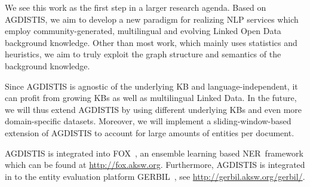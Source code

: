We see this work as the first step in a larger research agenda.
Based on AGDISTIS, we aim to develop a new paradigm for realizing \ac{NLP} services which employ community-generated, multilingual and evolving Linked Open Data background knowledge.
Other than most work, which mainly uses statistics and heuristics, we aim to truly exploit the graph structure and semantics of the background knowledge.

Since AGDISTIS is agnostic of the underlying \ac{KB} and language-independent, it can profit from growing \ac{KB}s as well as multilingual Linked Data.
In the future, we will thus extend AGDISTIS by using different underlying \ac{KB}s and even more domain-specific datasets.
Moreover, we will implement a sliding-window-based extension of AGDISTIS to account for large amounts of entities per document.
%



AGDISTIS is integrated into FOX~\cite{FOX}, an ensemble learning based \ac{NER}~framework which can be found at \url{http://fox.aksw.org}. 
Furthermore, AGDISTIS is integrated in to the entity evaluation platform GERBIL~\cite{GERBIL}, see \url{http://gerbil.aksw.org/gerbil/}.
